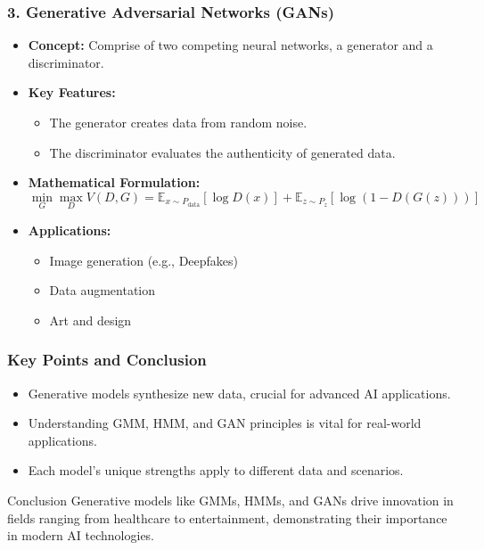 \documentclass[aspectratio=169]{beamer}
\begin{document}
\begin{frame}[fragile]
    \frametitle{3. Generative Adversarial Networks (GANs)}
    \begin{itemize}
        \item \textbf{Concept:} Comprise of two competing neural networks, a generator and a discriminator.
        \item \textbf{Key Features:}
        \begin{itemize}
            \item The generator creates data from random noise.
            \item The discriminator evaluates the authenticity of generated data.
        \end{itemize}
        \item \textbf{Mathematical Formulation:}
        \begin{equation}
            \min_G \max_D V(D, G) = \mathbb{E}_{x \sim P_{\text{data}}}[\log D(x)] + \mathbb{E}_{z \sim P_z}[\log(1 - D(G(z)))]
        \end{equation}
        \item \textbf{Applications:}
        \begin{itemize}
            \item Image generation (e.g., Deepfakes)
            \item Data augmentation
            \item Art and design
        \end{itemize}
    \end{itemize}
\end{frame}

\begin{frame}[fragile]
    \frametitle{Key Points and Conclusion}
    \begin{itemize}
        \item Generative models synthesize new data, crucial for advanced AI applications.
        \item Understanding GMM, HMM, and GAN principles is vital for real-world applications.
        \item Each model's unique strengths apply to different data and scenarios.
    \end{itemize}
    \begin{block}{Conclusion}
        Generative models like GMMs, HMMs, and GANs drive innovation in fields ranging from healthcare to entertainment, demonstrating their importance in modern AI technologies.
    \end{block}
\end{frame}
\end{document}
